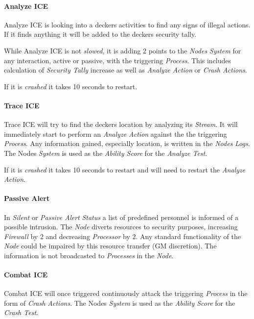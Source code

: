\paragraph{Analyze ICE}

Analyze ICE is looking into a deckers activities to find any signs of illegal
actions. If it finds anything it will be added to the deckers security tally.

While Analyze ICE is not \emph{slowed}, it is adding 2 points to the \emph{Nodes}
\emph{System} for any interaction, active or passive, with the triggering
\emph{Process}. This includes calculation of \emph{Security Tally} increase as
well as \emph{Analyze Action} or \emph{Crash Actions}.

If it is \emph{crashed} it takes 10 seconds to restart.

\paragraph{Trace ICE}

Trace ICE will try to find the deckers location by analyzing its \emph{Stream}.
It will immediately start to perform an \emph{Analyze Action}  against the
the triggering \emph{Process}. Any information gained, especially location,
is written in the \emph{Nodes} \emph{Logs}.
The Nodes \emph{System} is used as the \emph{Ability Score} for the
\emph{Analyze Test}.

If it is \emph{crashed} it takes 10 seconds to restart and will need to
restart the \emph{Analyze Action}.

\paragraph{Passive Alert}
In \emph{Silent} or \emph{Passive Alert} \emph{Status} a list of predefined
personnel is informed of a possible intrusion.
The \emph{Node} diverts resources to security purposes,
increasing \emph{Firewall} by 2 and decreasing \emph{Processor} by 2.
Any standard functionality of the \emph{Node} could be impaired by this
resource transfer (GM discretion).
The information is not broadcasted to \emph{Processes} in the \emph{Node}.

\paragraph{Combat ICE} Combat ICE will once triggered continuously attack the
triggering \emph{Process} in the form of \emph{Crash Actions}. The Nodes
\emph{System} is used as the \emph{Ability Score} for the \emph{Crash Test}.

